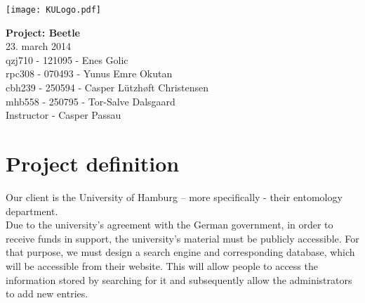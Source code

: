 \documentclass[12pt,a4paper]{article}
\begin{document}
	
	\begin{minipage}[b]{1.0\linewidth} 
		\texttt{[image: KULogo.pdf]}
		
		\vspace*{-16ex}
		\vspace {35ex}
		\begin{center}
			{\huge \bf Project: Beetle} \vspace*{4ex} \\
			{\large 23. march 2014}\\
			\vspace*{2ex}
			qzj710 - 121095 - Enes Golic \\
			rpc308 - 070493 - Yunus Emre Okutan \\
			cbh239 - 250594 - Casper Lützhøft Christensen \\
			mhb558 - 250795 - Tor-Salve Dalsgaard\\
			\vspace*{1ex}
			Instructor - Casper Passau
			
		\end{center}
	\end{minipage}
	
\newpage
\section{Project definition}
Our client is the University of Hamburg – more specifically - their entomology department.\\
Due to the university’s agreement with the German government, in order to receive funds in support, the university’s material must be publicly accessible. For that purpose, we must design a search engine and corresponding database, which will be accessible from their website. This will allow people to access the information stored by searching for it and subsequently allow the administrators to add new entries.\\ 
\end{document}
